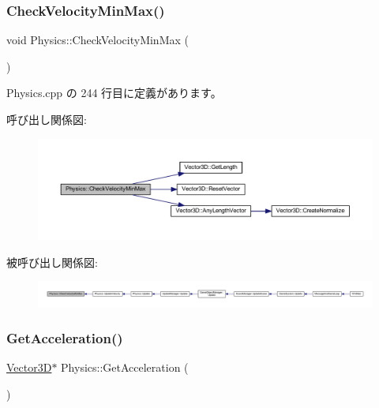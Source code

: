 \subsubsection{\texorpdfstring{Check\+Velocity\+Min\+Max()}{CheckVelocityMinMax()}}
{\footnotesize\ttfamily void Physics\+::\+Check\+Velocity\+Min\+Max (\begin{DoxyParamCaption}{ }\end{DoxyParamCaption})\hspace{0.3cm}{\ttfamily [private]}}



 Physics.\+cpp の 244 行目に定義があります。

呼び出し関係図\+:\nopagebreak
\begin{figure}[H]
\begin{center}
\leavevmode
\includegraphics[width=350pt]{class_physics_af6ad00988f0aa878285b930121d4748c_cgraph}
\end{center}
\end{figure}
被呼び出し関係図\+:
\nopagebreak
\begin{figure}[H]
\begin{center}
\leavevmode
\includegraphics[width=350pt]{class_physics_af6ad00988f0aa878285b930121d4748c_icgraph}
\end{center}
\end{figure}
\mbox{\label{class_physics_aee9ce4604f63dbdcab07ded4d0174989}} 
\subsubsection{\texorpdfstring{Get\+Acceleration()}{GetAcceleration()}}
{\footnotesize\ttfamily \mbox{\hyperlink{class_vector3_d}{Vector3D}}$\ast$ Physics\+::\+Get\+Acceleration (\begin{DoxyParamCaption}{ }\end{DoxyParamCaption})\hspace{0.3cm}{\ttfamily [inline]}}



